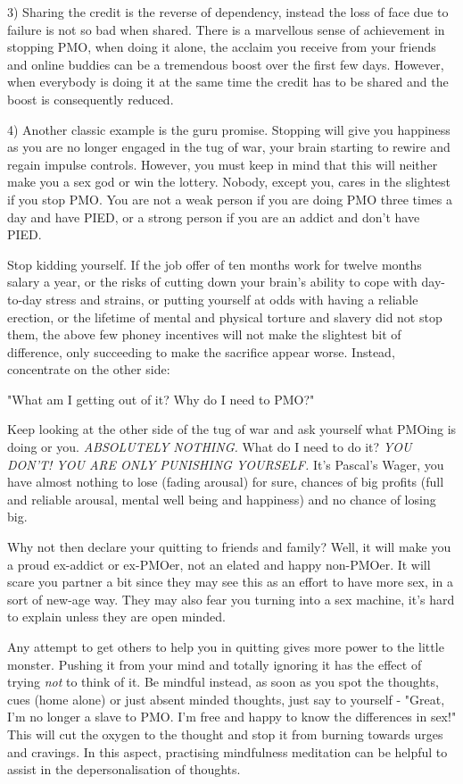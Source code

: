   3) Sharing the credit is the reverse of dependency, instead the loss of face due to failure is not so bad when shared. There is a marvellous sense of achievement in stopping PMO, when doing it alone, the acclaim you receive from your friends and online buddies can be a tremendous boost over the first few days. However, when everybody is doing it at the same time the credit has to be shared and the boost is consequently reduced.

  4) Another classic example is the guru promise. Stopping will give you happiness as you are no longer engaged in the tug of war, your brain starting to rewire and regain impulse controls. However, you must keep in mind that this will neither make you a sex god or win the lottery. Nobody, except you, cares in the slightest if you stop PMO. You are not a weak person if you are doing PMO three times a day and have PIED, or a strong person if you are an addict and don't have PIED.

Stop kidding yourself. If the job offer of ten months work for twelve months salary a year, or the risks of cutting down your brain's ability to cope with day-to-day stress and strains, or putting yourself at odds with having a reliable erection, or the lifetime of mental and physical torture and slavery did not stop them, the above few phoney incentives will not make the slightest bit of difference, only succeeding to make the sacrifice appear worse. Instead, concentrate on the other side:
  
  \huge{"What am I getting out of it? Why do I need to PMO?"}

Keep looking at the other side of the tug of war and ask yourself what PMOing is doing or you. \textit{ABSOLUTELY NOTHING.} What do I need to do it? \textit{YOU DON'T! YOU ARE ONLY PUNISHING YOURSELF.} It's Pascal's Wager, you have almost nothing to lose (fading arousal) for sure, chances of big profits (full and reliable arousal, mental well being and happiness) and no chance of losing big.

Why not then declare your quitting to friends and family? Well, it will make you a proud ex-addict or ex-PMOer, not an elated and happy non-PMOer. It will scare you partner a bit since they may see this as an effort to have more sex, in a sort of new-age way. They may also fear you turning into a sex machine, it's hard to explain unless they are open minded.

Any attempt to get others to help you in quitting gives more power to the little monster. Pushing it from your mind and totally ignoring it has the effect of trying \textit{not} to think of it. Be mindful instead, as soon as you spot the thoughts, cues (home alone) or just absent minded thoughts, just say to yourself - "Great, I'm no longer a slave to PMO. I'm free and happy to know the differences in sex!" This will cut the oxygen to the thought and stop it from burning towards urges and cravings. In this aspect, practising mindfulness meditation can be helpful to assist in the depersonalisation of thoughts.
